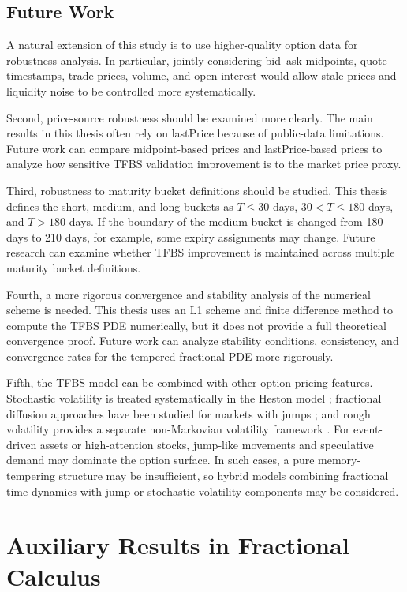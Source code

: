 \documentclass[11pt,a4paper]{report}
\begin{document}
\section{Future Work}

A natural extension of this study is to use higher-quality option data for robustness analysis. In particular, jointly considering bid--ask midpoints, quote timestamps, trade prices, volume, and open interest would allow stale prices and liquidity noise to be controlled more systematically.

Second, price-source robustness should be examined more clearly. The main results in this thesis often rely on lastPrice because of public-data limitations. Future work can compare midpoint-based prices and lastPrice-based prices to analyze how sensitive TFBS validation improvement is to the market price proxy.

Third, robustness to maturity bucket definitions should be studied. This thesis defines the short, medium, and long buckets as $T\le30$ days, $30<T\le180$ days, and $T>180$ days. If the boundary of the medium bucket is changed from 180 days to 210 days, for example, some expiry assignments may change. Future research can examine whether TFBS improvement is maintained across multiple maturity bucket definitions.

Fourth, a more rigorous convergence and stability analysis of the numerical scheme is needed. This thesis uses an L1 scheme and finite difference method to compute the TFBS PDE numerically, but it does not provide a full theoretical convergence proof. Future work can analyze stability conditions, consistency, and convergence rates for the tempered fractional PDE more rigorously.

Fifth, the TFBS model can be combined with other option pricing features. Stochastic volatility is treated systematically in the Heston model \cite{Heston1993}; fractional diffusion approaches have been studied for markets with jumps \cite{CarteaDelCastilloNegrete2007}; and rough volatility provides a separate non-Markovian volatility framework \cite{GatheralJaissonRosenbaum2018}. For event-driven assets or high-attention stocks, jump-like movements and speculative demand may dominate the option surface. In such cases, a pure memory-tempering structure may be insufficient, so hybrid models combining fractional time dynamics with jump or stochastic-volatility components may be considered.


\appendix

\chapter{Auxiliary Results in Fractional Calculus}
\end{document}
